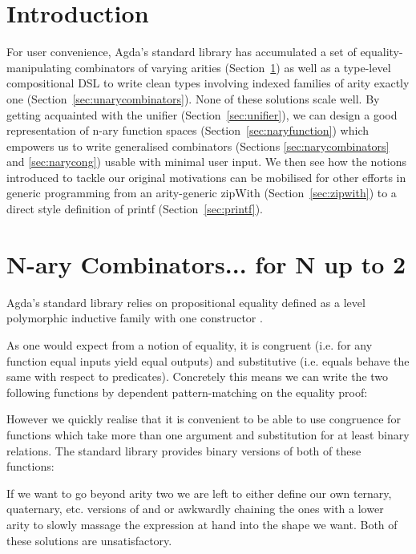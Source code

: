 \section*{Introduction}

For user convenience, Agda's standard library has accumulated a set of
equality-manipulating combinators of varying arities (Section~\ref{sec:nary2})
as well as a type-level compositional DSL to write clean types involving
indexed families of arity exactly one (Section~\ref{sec:unarycombinators}).
None of these solutions scale well. By getting acquainted with the unifier
(Section~\ref{sec:unifier}), we can design a good representation of n-ary
function spaces (Section~\ref{sec:naryfunction}) which empowers us to write
generalised combinators (Sections \ref{sec:narycombinators} and \ref{sec:narycong})
usable with minimal user input. We then see how the notions introduced to
tackle our original motivations can be mobilised for other efforts in generic
programming from an arity-generic zipWith (Section~\ref{sec:zipwith}) to a
direct style definition of printf (Section~\ref{sec:printf}).

\section{N-ary Combinators... for N up to 2}\label{sec:nary2}

Agda's standard library relies on propositional equality defined as
a level polymorphic inductive family with one constructor .


As one would expect from a notion of equality, it is congruent (i.e.
for any function equal inputs yield equal outputs) and substitutive
(i.e. equals behave the same with respect to predicates). Concretely
this means we can write the two following functions by dependent
pattern-matching on the equality proof:


However we quickly realise that it is convenient to be able to use
congruence for functions which take more than one argument and
substitution for at least binary relations. The standard library
provides binary versions of both of these functions:


If we want to go beyond arity two we are left to either define
our own ternary, quaternary, etc. versions of  and 
or awkwardly chaining the ones with a lower arity to slowly massage
the expression at hand into the shape we want. Both of these solutions
are unsatisfactory.

